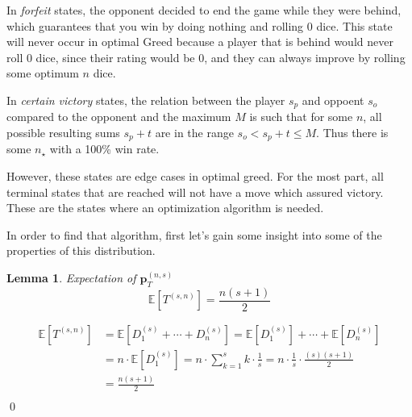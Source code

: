 \documentclass[a4paper]{article}
\newtheorem{lemma}{Lemma}
\renewenvironment{proof}{{\bfseries Proof}}{\qed}
\begin{document}
In \textit{forfeit} states, the opponent decided to end the game while they were behind, which guarantees that you win by doing nothing and rolling 0 dice. This state will never occur in optimal Greed because a player that is behind would never roll 0 dice, since their rating would be 0, and they can always improve by rolling some optimum $n$ dice. 

In \textit{certain victory} states, the relation between the player $s_p$ and oppoent $s_o$ compared to the opponent and the maximum $M$ is such that for some $n$, all possible resulting sums $s_p + t$ are in the range $s_o < s_p + t  \leq M$. Thus there is some $n_{\star}$ with a 100\% win rate.

However, these states are edge cases in optimal greed. For the most part, all terminal states that are reached will not have a move which assured victory. These are the states where an optimization algorithm is needed.

In order to find that algorithm, first let's gain some insight into some of the properties of this distribution.
%
\begin{lemma}{Expectation of $\textbf{p}_{T}^{(n, s)}$}
    $$ \mathbb{E}[T^{(s, n)}] = \frac{n(s+1)}{2} $$
\end{lemma}
%
\begin{proof}
    \begin{align*}
        \mathbb{E}[T^{(s, n)}] &= \mathbb{E}[D_{1}^{(s)} + \cdots + D_{n}^{(s)}] = \mathbb{E}[D_{1}^{(s)}] + \cdots + \mathbb{E}[D_{n}^{(s)}] \\
        &= n \cdot \mathbb{E}[D_{1}^{(s)}] = n \cdot \sum_{k=1}^{s} k \cdot \frac{1}{s} = n \cdot \frac{1}{s} \cdot \frac{(s)(s+1)}{2} \\
        &= \frac{n(s+1)}{2} \\
    \end{align*}
\end{proof}
\end{document}
